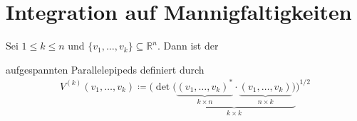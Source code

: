 %

\section{Integration auf Mannigfaltigkeiten}
\addtocounter{thmn}{1}
\setcounter{theorem}{0}


\begin{theorem}[Definition] \label{thm:11.1}
  Sei $1 \leq k \leq n$ und $\{ v_1 ,\ldots, v_k \} \subseteq \mathbb{R}^n$. Dann ist der 
  
  aufgespannten Parallelepipeds definiert durch
  \begin{align*}
    V^{(k)}(v_1 ,\ldots, v_k) \coloneq
    \Bigg(
      \det
      \underbrace{\Bigg(
        \underbrace{(v_1 ,\ldots, v_k)^*}_{k \times n} \cdot \underbrace{(v_1 ,\ldots, v_k)}_{n \times k}
      \Bigg)}_{k \times k}
    \Bigg)^{1/2}
  \end{align*}
\end{theorem}

